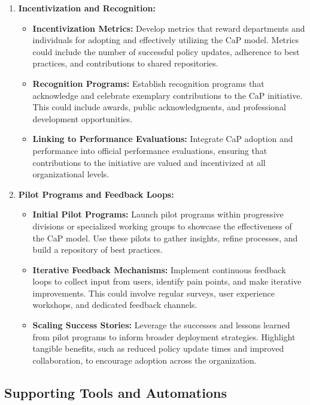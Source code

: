 \documentclass[11pt]{article}
\begin{document}
\begin{enumerate}
    \item \textbf{Incentivization and Recognition:}
    \begin{itemize}
        \item \textbf{Incentivization Metrics:} Develop metrics that reward departments and individuals for adopting and effectively utilizing the CaP model. Metrics could include the number of successful policy updates, adherence to best practices, and contributions to shared repositories.
        \item \textbf{Recognition Programs:} Establish recognition programs that acknowledge and celebrate exemplary contributions to the CaP initiative. This could include awards, public acknowledgments, and professional development opportunities.
        \item \textbf{Linking to Performance Evaluations:} Integrate CaP adoption and performance into official performance evaluations, ensuring that contributions to the initiative are valued and incentivized at all organizational levels.
    \end{itemize}

    \item \textbf{Pilot Programs and Feedback Loops:}
    \begin{itemize}
        \item \textbf{Initial Pilot Programs:} Launch pilot programs within progressive divisions or specialized working groups to showcase the effectiveness of the CaP model. Use these pilots to gather insights, refine processes, and build a repository of best practices.
        \item \textbf{Iterative Feedback Mechanisms:} Implement continuous feedback loops to collect input from users, identify pain points, and make iterative improvements. This could involve regular surveys, user experience workshops, and dedicated feedback channels.
        \item \textbf{Scaling Success Stories:} Leverage the successes and lessons learned from pilot programs to inform broader deployment strategies. Highlight tangible benefits, such as reduced policy update times and improved collaboration, to encourage adoption across the organization.
    \end{itemize}
\end{enumerate}

\subsection{Supporting Tools and Automations}
\end{document}
